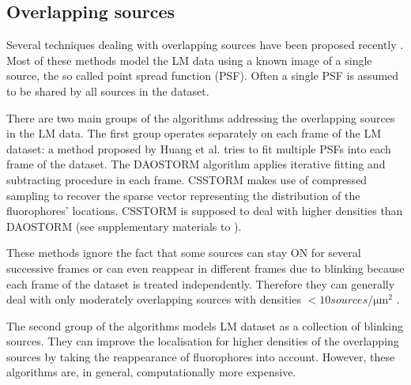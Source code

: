 
\subsection{Overlapping sources\label{sec:Overlapping sources}}

Several techniques dealing with overlapping sources have been proposed recently \cite{Lidke2005,Harrington2008,Huang2011,Holden2011,Cox2011,Zhu2012}. Most of these methods model the LM data using a known image of a single source, the so called point spread function (PSF). Often a single PSF is assumed to be shared by all sources in the dataset.

There are two main groups of the algorithms addressing the overlapping sources in the LM data. The first group operates separately on each frame of the LM dataset: a method proposed by Huang et al. \cite{Huang2011} tries to fit multiple PSFs into each frame of the dataset. The DAOSTORM algorithm \cite{Holden2011} applies iterative fitting and subtracting procedure in each frame.  CSSTORM \cite{Zhu2012} makes use of compressed sampling to recover the sparse vector representing the distribution of the fluorophores' locations. CSSTORM is supposed to deal with higher densities than DAOSTORM (see supplementary materials to \cite{Zhu2012}).

These methods ignore the fact that some sources can stay ON for several successive frames or can even reappear in different frames due to blinking because each frame of the dataset is treated independently. Therefore they can generally deal with only moderately overlapping sources with densities $<10\unit{sources/\um^2}$ \cite{Huang2011,Holden2011,Zhu2012}.

The second group of the algorithms models LM dataset as a collection of blinking sources. They can improve the localisation for higher densities of the overlapping sources by taking the reappearance of fluorophores into account. However, these algorithms are, in general, computationally more expensive. 

